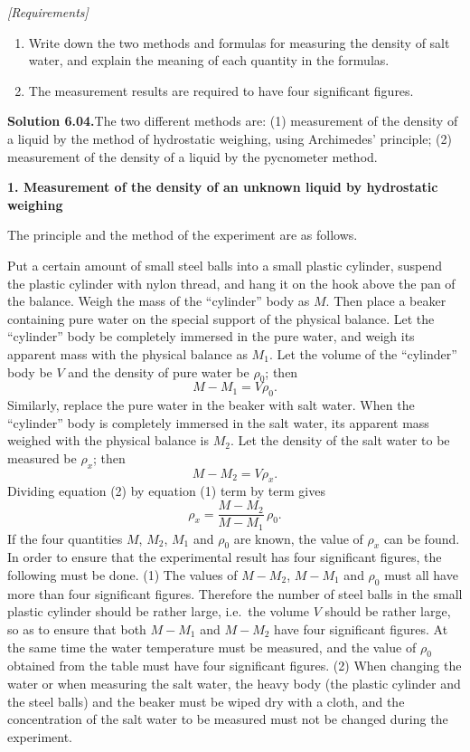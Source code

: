 \noindent\textit{[Requirements]}
\begin{enumerate}[label=(\arabic*),leftmargin=2.2em,itemsep=1pt,topsep=2pt]
\item Write down the two methods and formulas for measuring the density of salt water, and explain the meaning of each quantity in the formulas.
\item The measurement results are required to have four significant figures.
\end{enumerate}

\medskip
\noindent\textbf{Solution 6.04.}\quad The two different methods are: (1) measurement of the density of a liquid by the method of hydrostatic weighing, using Archimedes' principle; (2) measurement of the density of a liquid by the pycnometer method.

\textbf{1. Measurement of the density of an unknown liquid by hydrostatic weighing}

The principle and the method of the experiment are as follows.

Put a certain amount of small steel balls into a small plastic cylinder, suspend the plastic cylinder with nylon thread, and hang it on the hook above the pan of the balance. Weigh the mass of the ``cylinder'' body as $M$. Then place a beaker containing pure water on the special support of the physical balance. Let the ``cylinder'' body be completely immersed in the pure water, and weigh its apparent mass with the physical balance as $M_1$. Let the volume of the ``cylinder'' body be $V$ and the density of pure water be $\rho_0$; then
\begin{equation}\tag{1}
M-M_1=V\rho_0.
\end{equation}
Similarly, replace the pure water in the beaker with salt water. When the ``cylinder'' body is completely immersed in the salt water, its apparent mass weighed with the physical balance is $M_2$. Let the density of the salt water to be measured be $\rho_x$; then
\begin{equation}\tag{2}
M-M_2=V\rho_x.
\end{equation}
Dividing equation (2) by equation (1) term by term gives
\begin{equation}\tag{3}
\rho_x=\frac{M-M_2}{M-M_1}\,\rho_0.
\end{equation}
If the four quantities $M$, $M_2$, $M_1$ and $\rho_0$ are known, the value of $\rho_x$ can be found. In order to ensure that the experimental result has four significant figures, the following must be done. (1) The values of $M-M_2$, $M-M_1$ and $\rho_0$ must all have more than four significant figures. Therefore the number of steel balls in the small plastic cylinder should be rather large, i.e.\ the volume $V$ should be rather large, so as to ensure that both $M-M_1$ and $M-M_2$ have four significant figures. At the same time the water temperature must be measured, and the value of $\rho_0$ obtained from the table must have four significant figures. (2) When changing the water or when measuring the salt water, the heavy body (the plastic cylinder and the steel balls) and the beaker must be wiped dry with a cloth, and the concentration of the salt water to be measured must not be changed during the experiment.

